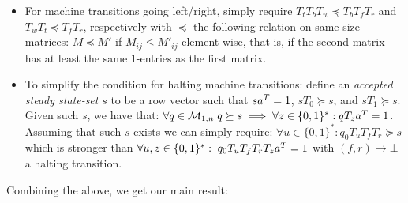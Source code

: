 \begin{itemize}

  \item For machine transitions going left/right, simply require $T_t T_b T_w\preceq T_b T_f T_r$ and $T_w T_t\preceq T_f T_r$, respectively with $\preceq$ the following relation on same-size matrices: $M\preceq M'$ if $M_{ij}\le M'_{ij}$ element-wise, that is, if the second matrix has at least the same 1-entries as the first matrix.

  \item To simplify the condition for halting machine transitions: define an \emph{accepted steady state-set} $s$ to be a row vector such that $sa^T = 1$, $s T_0\succeq s$, and $s T_1\succeq s$. Given such $s$, we have that: $\forall q\in\mathcal{M}_{1,n}\; q \succeq s\implies \forall z\in\{0, 1\}^*: qT_{z}a^T = 1$. Assuming that such $s$ exists we can simply require: $\forall u\in\{0, 1\}^*: q_0T_u T_f T_r \succeq s$ which is stronger than $\forall u,z\in\{0, 1\}^*: \; q_0 T_u T_f T_r T_z a^T = 1$ with $(f,r) \to \bot$ a halting transition.



\end{itemize}

Combining the above, we get our main result:

